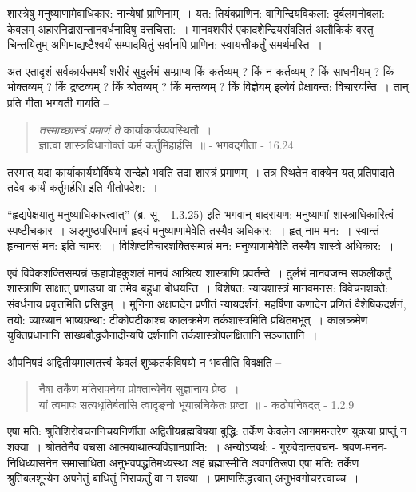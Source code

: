 {शास्त्रेषु मनुष्याणामेवाधिकार: नान्येषां प्राणिनाम्~। यत: तिर्यक्प्राणिन: वागिन्द्रियविकला: दुर्बलमनोबला: केवलम् अहारनिद्रासन्तानवर्धनादिषु दत्तचित्ता:~। मानवशरीरं एकादशेन्द्रियसंवलितं अलौकिकं वस्तु चिन्तयितुम् अणिमाद्यष्टैश्वर्यं सम्पादयितुं सर्वानपि प्राणिन: स्वायत्तीकर्तुं समर्थमस्ति~। 

अत एतादृशं सर्वकार्यसमर्थं शरीरं सुदुर्लभं सम्प्राप्य किं कर्तव्यम् ? किं न कर्तव्यम् ? किं साधनीयम् ? किं भोक्तव्यम् ? किं द्रष्टव्यम् ? किं श्रोतव्यम् ? किं मन्तव्यम् ? किं विज्ञेयम् इत्येवं प्रेक्षावन्त: विचारयन्ति~। तान् प्रति गीता भगवती गायति –
\begin{verse}
\textit{तस्माच्छास्त्रं प्रमाणं ते} कार्याकार्यव्यवस्थितौ~। \\
ज्ञात्वा शास्त्रविधानोक्तं कर्म कर्तुमिहार्हसि~॥ - भगवद्गीता - 16.24
\end{verse}
तस्मात् यदा कार्याकार्ययोर्विषये सन्देहो भवति तदा शास्त्रं प्रमाणम्~। तत्र स्थितेन वाक्येन यत् प्रतिपाद्यते तदेव कार्यं कर्तुमर्हसि इति गीतोपदेश:~। 

“हृद्यपेक्षयातु मनुष्याधिकारत्वात्” (ब्र. सू – 1.3.25) इति भगवान् बादरायण: मनुष्याणां शास्त्राधिकारित्वं स्पष्टीचकार~। अङ्गुष्ठपरिमाणं हृदयं मनुष्याणामेवेति तस्यैव अधिकार:~। हृत् नाम मन:~। स्वान्तं हृन्मानसं मन: इति चामर:~। विशिष्टविचारशक्तिसम्पन्नं मन: मनुष्याणामेवेति तस्यैव शास्त्रे अधिकार:~। 

एवं विवेकशक्तिसम्पन्नं ऊहापोहकुशलं मानवं आश्रित्य शास्त्राणि प्रवर्तन्ते~। दुर्लभं मानवजन्म सफलीकर्तुं शास्त्राणि साक्षात् प्रणाड्या वा तमेव बहुधा बोधयन्ति~। विशेषत: न्यायशास्त्रं मानवमनस: विवेचनशक्ते: संवर्धनाय प्रवृत्तमिति प्रसिद्धम्~। मुनिना अक्षपादेन प्रणीतं न्यायदर्शनं, महर्षिणा कणादेन प्रणितं वैशेषिकदर्शनं, तयो: व्याख्यानं भाष्यग्रन्था: टीकोपटीकाश्च कालक्रमेण तर्कशास्त्रमिति प्रथितमभूत्~। कालक्रमेण युक्तिप्रधानानि सांख्यबौद्धजैनादीन्यपि दर्शनानि तर्कशास्त्रोपलक्षितानि सञ्जातानि~। 

औपनिषदं अद्वितीयमात्मतत्त्वं केवलं शुष्कतर्कविषयो न भवतीति विवक्षति –
\begin{verse}
नैषा तर्केण मतिरापनेया प्रोक्तान्येनैव सुज्ञानाय प्रेष्ठ~। \\
यां त्वमापः सत्यधृतिर्बतासि त्वादृङ्नो भूयान्नचिकेतः प्रष्टा~॥ - कठोपनिषदत् - 1.2.9
\end{verse}
एषा मति: श्रुतिशिरोवचननिचयनिर्णीता अद्वितीयब्रह्मविषया बुद्धि: तर्केण केवलेन आगममन्तरेण युक्त्या प्राप्तुं न शक्या~। श्रोततेनैव वचसा आत्मयाथात्म्यविज्ञानप्राप्ति:~। अन्योऽप्यर्थ: - गुरुवेदान्तवचन- श्रवण-मनन-निधिध्यासनेन समासाधिता अनुभवपद्धतिमध्यस्था अहं ब्रह्मास्मीति अवगतिरूपा एषा मति: तर्केण श्रुतिबलशून्येन अपनेतुं बाधितुं निराकर्तुं वा न शक्या~। प्रमाणसिद्धत्त्वात् अनुभवगोचरत्त्वाच्च~। 

}
